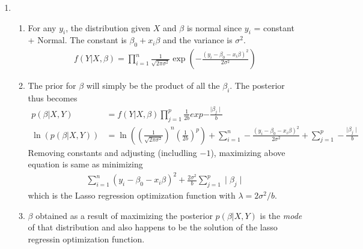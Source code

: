 \documentclass[../statistical_learning_notes.tex]{subfiles}
\begin{document}
\begin{enumerate}
        \item
        \begin{enumerate}
            \item For any $y_{i}$, the distribution given $X$ and $\beta$ is normal since $y_{i}$ = constant + Normal. The constant is $\beta_{0} + x_{i}\beta$ and the variance is $\sigma^{2}$.
            \begin{align*}
                f(Y|X,\beta) = \prod_{i=1}^{n} \frac{1}{\sqrt{2\pi \sigma^{2}}}\exp(-\frac{(y_{i}-\beta_{0}-x_{i}\beta)^{2}}{2\sigma^{2}})
            \end{align*}
            \item The prior for $\beta$ will simply be the product of all the $\beta_{i}$. The posterior thus becomes
            \begin{align*}
                p(\beta|X,Y) &= f(Y|X,\beta)\prod_{j=1}^{p}\frac{1}{2b}exp{-\frac{\mid \beta_{j} \mid}{b}}\\
                \ln(p(\beta|X,Y)) &= \ln((\frac{1}{\sqrt{2\pi \sigma^{2}}})^{n} (\frac{1}{2b})^{p}) + \sum_{i=1}^{n} -\frac{(y_{i}-\beta_{0}-x_{i}\beta)^{2}}{2\sigma^{2}} + \sum_{j=1}^{p} -\frac{\mid \beta_{j} \mid}{b}
            \end{align*}
            Removing constants and adjusting (includling $-1$), maximizing above equation is same as minimizing
            \begin{align*}
                \sum_{i=1}^{n} (y_{i}-\beta_{0}-x_{i}\beta)^{2} + \frac{2\sigma^{2}}{b}\sum_{j=1}^{p} \mid \beta_{j} \mid
            \end{align*}
            which is the Lasso regression optimization function with $\lambda = 2\sigma^{2}/b$.

            \item $\beta$ obtained as a result of maximizing the posterior $p(\beta|X,Y)$ is the \emph{mode} of that distribution and also happens to be the solution of the lasso regressin optimization function.


\end{enumerate}
\end{enumerate}
\end{document}
